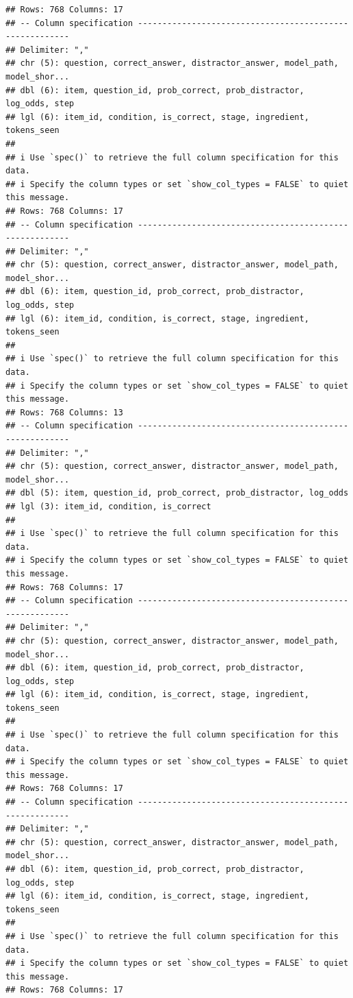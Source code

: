 \documentclass[
]{article}
\begin{document}
\begin{verbatim}
## Rows: 768 Columns: 17
## -- Column specification --------------------------------------------------------
## Delimiter: ","
## chr (5): question, correct_answer, distractor_answer, model_path, model_shor...
## dbl (6): item, question_id, prob_correct, prob_distractor, log_odds, step
## lgl (6): item_id, condition, is_correct, stage, ingredient, tokens_seen
## 
## i Use `spec()` to retrieve the full column specification for this data.
## i Specify the column types or set `show_col_types = FALSE` to quiet this message.
## Rows: 768 Columns: 17
## -- Column specification --------------------------------------------------------
## Delimiter: ","
## chr (5): question, correct_answer, distractor_answer, model_path, model_shor...
## dbl (6): item, question_id, prob_correct, prob_distractor, log_odds, step
## lgl (6): item_id, condition, is_correct, stage, ingredient, tokens_seen
## 
## i Use `spec()` to retrieve the full column specification for this data.
## i Specify the column types or set `show_col_types = FALSE` to quiet this message.
## Rows: 768 Columns: 13
## -- Column specification --------------------------------------------------------
## Delimiter: ","
## chr (5): question, correct_answer, distractor_answer, model_path, model_shor...
## dbl (5): item, question_id, prob_correct, prob_distractor, log_odds
## lgl (3): item_id, condition, is_correct
## 
## i Use `spec()` to retrieve the full column specification for this data.
## i Specify the column types or set `show_col_types = FALSE` to quiet this message.
## Rows: 768 Columns: 17
## -- Column specification --------------------------------------------------------
## Delimiter: ","
## chr (5): question, correct_answer, distractor_answer, model_path, model_shor...
## dbl (6): item, question_id, prob_correct, prob_distractor, log_odds, step
## lgl (6): item_id, condition, is_correct, stage, ingredient, tokens_seen
## 
## i Use `spec()` to retrieve the full column specification for this data.
## i Specify the column types or set `show_col_types = FALSE` to quiet this message.
## Rows: 768 Columns: 17
## -- Column specification --------------------------------------------------------
## Delimiter: ","
## chr (5): question, correct_answer, distractor_answer, model_path, model_shor...
## dbl (6): item, question_id, prob_correct, prob_distractor, log_odds, step
## lgl (6): item_id, condition, is_correct, stage, ingredient, tokens_seen
## 
## i Use `spec()` to retrieve the full column specification for this data.
## i Specify the column types or set `show_col_types = FALSE` to quiet this message.
## Rows: 768 Columns: 17

\end{verbatim}
\end{document}
